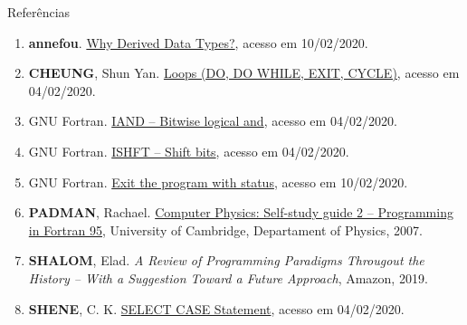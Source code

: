 \begin{frame}[fragile]{Referências}

    \begin{enumerate}

        \item \textbf{annefou}. \href{https://annefou.github.io/Fortran/derivedTypes/derived_types.html}{Why Derived Data Types?}, acesso em 10/02/2020.
 
        \item \textbf{CHEUNG}, Shun Yan. \href{http://www.mathcs.emory.edu/~cheung/Courses/561/Syllabus/5-Fortran/do.html}{Loops (DO, DO WHILE, EXIT, CYCLE)}, acesso em 04/02/2020.

        \item GNU Fortran. \href{https://gcc.gnu.org/onlinedocs/gfortran/IAND.html#IAND}{IAND -- Bitwise logical and}, acesso em 04/02/2020.

        \item GNU Fortran. \href{https://gcc.gnu.org/onlinedocs/gfortran/IAND.html#ISHFT}{ISHFT -- Shift bits}, acesso em 04/02/2020.

        \item GNU Fortran. \href{https://gcc.gnu.org/onlinedocs/gfortran/EXIT.html}{Exit the program with status}, acesso em 10/02/2020. 

        \item \textbf{PADMAN}, Rachael. \href{http://www.mrao.cam.ac.uk/~rachael/compphys/SelfStudyF95.pdf}{Computer Physics: Self-study guide 2 -- Programming in Fortran 95}, University of 
        Cambridge, Departament of Physics, 2007.

        \item \textbf{SHALOM}, Elad. \textit{A Review of Programming Paradigms Througout the 
            History -- With a Suggestion Toward a Future Approach}, Amazon, 2019.

        \item \textbf{SHENE}, C. K. \href{https://pages.mtu.edu/~shene/COURSES/cs201/NOTES/chap03/select.html}{SELECT CASE Statement}, acesso em 04/02/2020. 
 
    \end{enumerate}

\end{frame}
